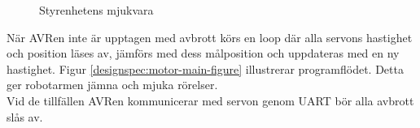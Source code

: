 \begin{figure}
\centering
\begin{minipage}[b]{.5\linewidth}
\centering
\scalebox{0.7}{}
\label{designspec:motor-interrupt-figure}
\end{minipage}%
\begin{minipage}[b]{.5\linewidth}
\centering
\scalebox{0.7}{}
\label{designspec:motor-main-figure}
\end{minipage}
\caption{Styrenhetens mjukvara}\label{fig:1}
\end{figure}

När AVRen inte är upptagen med avbrott körs en loop där alla servons hastighet och position läses av, jämförs med dess målposition och uppdateras med en ny hastighet. Figur \ref{designspec:motor-main-figure} illustrerar programflödet. Detta ger robotarmen jämna och mjuka rörelser. \\
Vid de tillfällen AVRen kommunicerar med servon genom UART bör alla avbrott slås av.  \\
